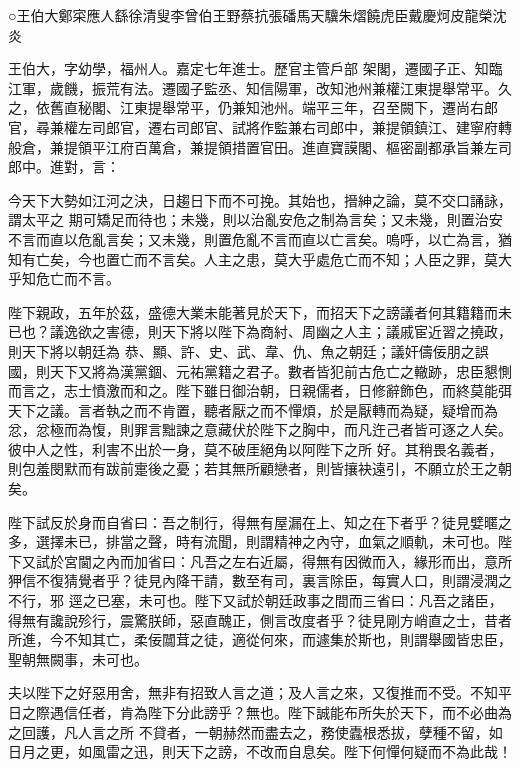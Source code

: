 
\begin{pinyinscope}

 ○王伯大鄭寀應人繇徐清叟李曾伯王野蔡抗張磻馬天驥朱熠饒虎臣戴慶炣皮龍榮沈炎



 王伯大，字幼學，福州人。嘉定七年進士。歷官主管戶部
 架閣，遷國子正、知臨江軍，歲饑，振荒有法。遷國子監丞、知信陽軍，改知池州兼權江東提舉常平。久之，依舊直秘閣、江東提舉常平，仍兼知池州。端平三年，召至闕下，遷尚右郎官，尋兼權左司郎官，遷右司郎官、試將作監兼右司郎中，兼提領鎮江、建寧府轉般倉，兼提領平江府百萬倉，兼提領措置官田。進直寶謨閣、樞密副都承旨兼左司郎中。進對，言：



 今天下大勢如江河之決，日趨日下而不可挽。其始也，搢紳之論，莫不交口誦詠，謂太平之
 期可矯足而待也；未幾，則以治亂安危之制為言矣；又未幾，則置治安不言而直以危亂言矣；又未幾，則置危亂不言而直以亡言矣。嗚呼，以亡為言，猶知有亡矣，今也置亡而不言矣。人主之患，莫大乎處危亡而不知；人臣之罪，莫大乎知危亡而不言。



 陛下親政，五年於茲，盛德大業未能著見於天下，而招天下之謗議者何其籍籍而未已也？議逸欲之害德，則天下將以陛下為商紂、周幽之人主；議戚宦近習之撓政，則天下將以朝廷為
 恭、顯、許、史、武、韋、仇、魚之朝廷；議奸儔佞朋之誤國，則天下又將為漢黨錮、元祐黨籍之君子。數者皆犯前古危亡之轍跡，忠臣懇惻而言之，志士憤激而和之。陛下雖日御治朝，日親儒者，日修辭飾色，而終莫能弭天下之議。言者執之而不肯置，聽者厭之而不憚煩，於是厭轉而為疑，疑增而為忿，忿極而為愎，則罪言黜諫之意藏伏於陛下之胸中，而凡迕己者皆可逐之人矣。彼中人之性，利害不出於一身，莫不破厓絕角以阿陛下之所
 好。其稍畏名義者，則包羞閔默而有跋前疐後之憂；若其無所顧戀者，則皆攘袂遠引，不願立於王之朝矣。



 陛下試反於身而自省曰：吾之制行，得無有屋漏在上、知之在下者乎？徒見嬖暱之多，選擇未已，排當之聲，時有流聞，則謂精神之內守，血氣之順軌，未可也。陛下又試於宮閫之內而加省曰：凡吾之左右近屬，得無有因微而入，緣形而出，意所狎信不復猜覺者乎？徒見內降干請，數至有司，裏言除臣，每實人口，則謂浸潤之不行，邪
 逕之已塞，未可也。陛下又試於朝廷政事之間而三省曰：凡吾之諸臣，得無有讒說殄行，震驚朕師，惡直醜正，側言改度者乎？徒見剛方峭直之士，昔者所進，今不知其亡，柔佞闒茸之徒，適從何來，而遽集於斯也，則謂舉國皆忠臣，聖朝無闕事，未可也。



 夫以陛下之好惡用舍，無非有招致人言之道；及人言之來，又復推而不受。不知平日之際遇信任者，肯為陛下分此謗乎？無也。陛下誠能布所失於天下，而不必曲為之回護，凡人言之所
 不貸者，一朝赫然而盡去之，務使蠹根悉拔，孽種不留，如日月之更，如風雷之迅，則天下之謗，不改而自息矣。陛下何憚何疑而不為此哉！




\end{pinyinscope}

